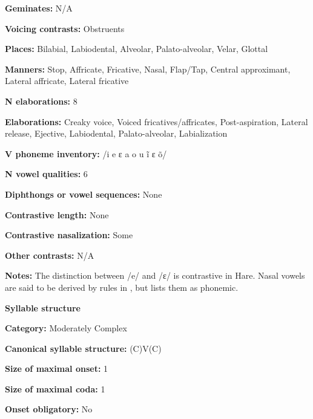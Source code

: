 \textbf{Geminates:} N/A



\textbf{Voicing contrasts:} Obstruents



\textbf{Places:} Bilabial, Labiodental, Alveolar, Palato-alveolar, Velar, Glottal



\textbf{Manners:} Stop, Affricate, Fricative, Nasal, Flap/Tap, Central approximant, Lateral affricate, Lateral fricative



\textbf{N elaborations:} 8



\textbf{Elaborations:} Creaky voice, Voiced fricatives/affricates, Post-aspiration, Lateral release, Ejective, Labiodental, Palato-alveolar, Labialization



\textbf{V phoneme inventory:} /i e ɛ a o u ĩ ɛ õ/



\textbf{N vowel qualities:} 6



\textbf{Diphthongs or vowel sequences:} None



\textbf{Contrastive length:} None



\textbf{Contrastive nasalization:} Some



\textbf{Other contrasts:} N/A



\textbf{Notes:} The distinction between /e/ and /ɛ/ is contrastive in Hare. Nasal vowels are said to be derived by rules in \citet{Rice1989}, but \citet{Rice2005} lists them as phonemic.



\textbf{Syllable structure}



\textbf{Category:} Moderately Complex



\textbf{Canonical syllable structure:} (C)V(C) \citep[143-53]{Rice1989}



\textbf{Size of maximal onset:} 1



\textbf{Size of maximal coda:} 1



\textbf{Onset obligatory:} No



